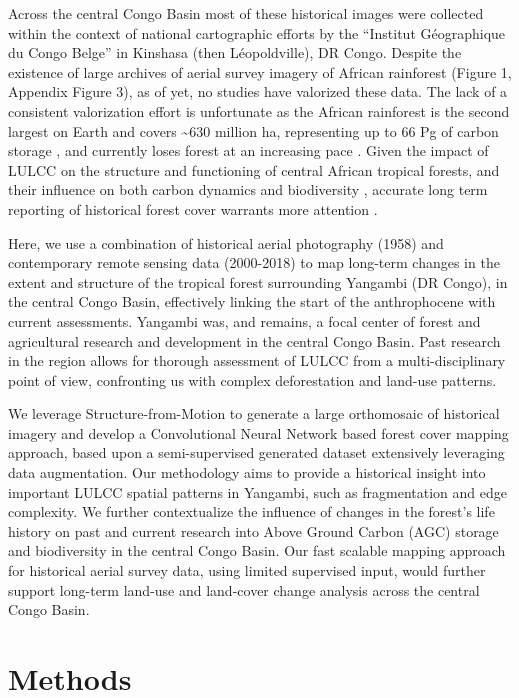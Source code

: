 \documentclass[remote sensing,article,submit,moreauthors,pdftex]{mdpi}
\begin{document}
Across the central Congo Basin most of these historical images were
collected within the context of national cartographic efforts by the
``Institut Géographique du Congo Belge'' in Kinshasa (then
Léopoldville), DR Congo. Despite the existence of large archives of
aerial survey imagery of African rainforest (Figure 1, Appendix Figure
3), as of yet, no studies have valorized these data. The lack of a
consistent valorization effort is unfortunate as the African rainforest
is the second largest on Earth and covers \textasciitilde{}630 million
ha, representing up to 66 Pg of carbon storage \citep{Lewis2009b}, and
currently loses forest at an increasing pace \citep{butsic2015}. Given
the impact of LULCC on the structure and functioning of central African
tropical forests, and their influence on both carbon dynamics
\citep{Kearsley2013} and biodiversity \citep{vandeperre2018}, accurate
long term reporting of historical forest cover warrants more attention
\citep{willcock2016}.

Here, we use a combination of historical aerial photography (1958) and
contemporary remote sensing data (2000-2018) to map long-term changes in
the extent and structure of the tropical forest surrounding Yangambi (DR
Congo), in the central Congo Basin, effectively linking the start of the
anthrophocene \citep{lewis2015} with current assessments. Yangambi was,
and remains, a focal center of forest and agricultural research and
development in the central Congo Basin. Past research in the region
allows for thorough assessment of LULCC from a multi-disciplinary point
of view, confronting us with complex deforestation and land-use
patterns.

We leverage Structure-from-Motion to generate a large orthomosaic of
historical imagery and develop a Convolutional Neural Network based
forest cover mapping approach, based upon a semi-supervised generated
dataset extensively leveraging data augmentation. Our methodology aims
to provide a historical insight into important LULCC spatial patterns in
Yangambi, such as fragmentation and edge complexity. We further
contextualize the influence of changes in the forest's life history on
past and current research into Above Ground Carbon (AGC) storage
\citep{Kearsley2013} and biodiversity \citep{vandeperre2018} in the
central Congo Basin. Our fast scalable mapping approach for historical
aerial survey data, using limited supervised input, would further
support long-term land-use and land-cover change analysis across the
central Congo Basin.

\hypertarget{methods}{%
\section{Methods}\label{methods}}
\end{document}
